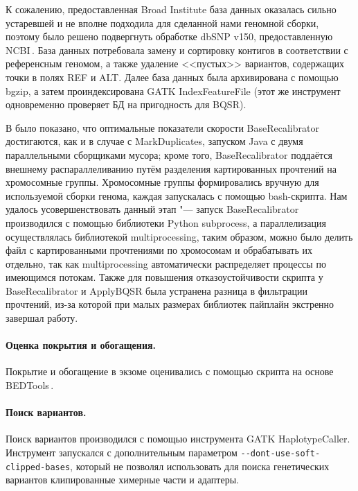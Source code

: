 \documentclass[a4paper,14pt]{extarticle}
\newcommand{\utilname}[1]{\textenglish{#1}}
\newcommand{\ecitep}[1]{\textenglish{\citep{#1}}}
\begin{document}
К сожалению, предоставленная Broad Institute база данных оказалась сильно устаревшей и не вполне подходила для сделанной нами геномной сборки, поэтому было решено подвергнуть обработке dbSNP v150, предоставленную NCBI\,\ecitep{Sherry_2001}.
База данных потребовала замену и сортировку контигов в соответствии с референсным геномом, а также удаление <<пустых>> вариантов, содержащих точки в полях REF и ALT.
Далее база данных была архивирована с помощью \utilname{bgzip}, а затем проиндексирована \utilname{GATK IndexFeatureFile} (этот же инструмент одновременно проверяет БД на пригодность для BQSR).

В \citet{Heldenbrand_2019} было показано, что оптимальные показатели скорости \utilname{BaseRecalibrator} достигаются, как и в случае с \utilname{MarkDuplicates}, запуском \utilname{Java} с двумя параллельными сборщиками мусора;
кроме того, \utilname{BaseRecalibrator} поддаётся внешнему распараллеливанию путём разделения картированных прочтений на хромосомные группы.
Хромосомные группы формировались вручную для используемой сборки генома, каждая запускалась с помощью \utilname{bash}-скрипта.
Нам удалось усовершенствовать данный этап "--- запуск \utilname{BaseRecalibrator} производился с помощью библиотеки \utilname{Python} \utilname{subprocess}, а параллелизация осуществлялась библиотекой \utilname{multiprocessing}, таким образом, можно было делить файл с картированными прочтениями по хромосомам и обрабатывать их отдельно, так как \utilname{multiprocessing} автоматически распределяет процессы по имеющимся потокам.
Также для повышения отказоустойчивости скрипта у \utilname{BaseRecalibrator} и \utilname{ApplyBQSR} была устранена разница в фильтрации прочтений, из-за которой при малых размерах библиотек пайплайн экстренно завершал работу.

\paragraph{Оценка покрытия и обогащения.}
Покрытие и обогащение в экзоме оценивались с помощью скрипта на основе \utilname{BEDTools}\,\ecitep{Quinlan_2010}.

\paragraph{Поиск вариантов.}
Поиск вариантов производился с помощью инструмента \utilname{GATK HaplotypeCaller}.
Инструмент запускался с дополнительным параметром \verb|--dont-use-soft-clipped-bases|, который не позволял использовать для поиска генетических вариантов клипированные химерные части и адаптеры.
\end{document}
